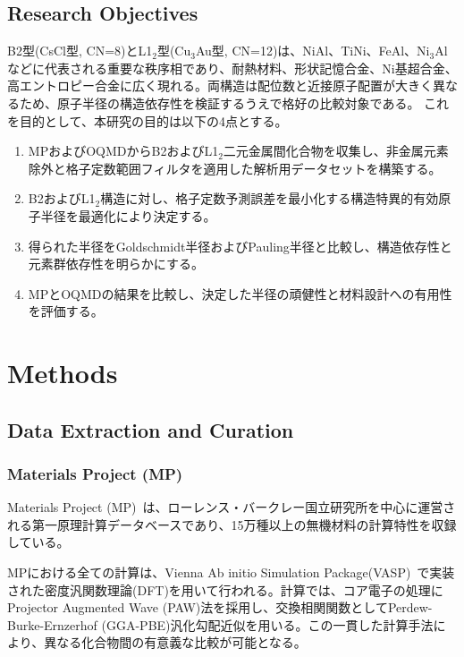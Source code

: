 \documentclass[a4paper,10pt,5p]{elsarticle}
\begin{document}
\subsection{Research Objectives}
B2型(CsCl型, CN=8)とL1$_2$型(Cu$_3$Au型, CN=12)は、NiAl、TiNi、FeAl、Ni$_3$Alなどに代表される重要な秩序相であり、耐熱材料、形状記憶合金、Ni基超合金、高エントロピー合金に広く現れる。両構造は配位数と近接原子配置が大きく異なるため、原子半径の構造依存性を検証するうえで格好の比較対象である。
これを目的として、本研究の目的は以下の4点とする。
\begin{enumerate}
\setlength{\parskip}{0cm}
\setlength{\itemsep}{0cm}
    \item MPおよびOQMDからB2およびL1$_2$二元金属間化合物を収集し、非金属元素除外と格子定数範囲フィルタを適用した解析用データセットを構築する。
    \item B2およびL1$_2$構造に対し、格子定数予測誤差を最小化する構造特異的有効原子半径を最適化により決定する。
    \item 得られた半径をGoldschmidt半径およびPauling半径と比較し、構造依存性と元素群依存性を明らかにする。
    \item MPとOQMDの結果を比較し、決定した半径の頑健性と材料設計への有用性を評価する。
\end{enumerate}


\section{Methods}

\subsection{Data Extraction and Curation}

\subsubsection{Materials Project (MP)}

Materials Project (MP)~\citep{jain2013}は、ローレンス・バークレー国立研究所を中心に運営される第一原理計算データベースであり、15万種以上の無機材料の計算特性を収録している。

MPにおける全ての計算は、Vienna Ab initio Simulation Package(VASP)~\citep{kresse1996}で実装された密度汎関数理論(DFT)を用いて行われる。計算では、コア電子の処理にProjector Augmented Wave (PAW)法を採用し、交換相関関数としてPerdew-Burke-Ernzerhof (GGA-PBE)汎化勾配近似を用いる。この一貫した計算手法により、異なる化合物間の有意義な比較が可能となる。
\end{document}
